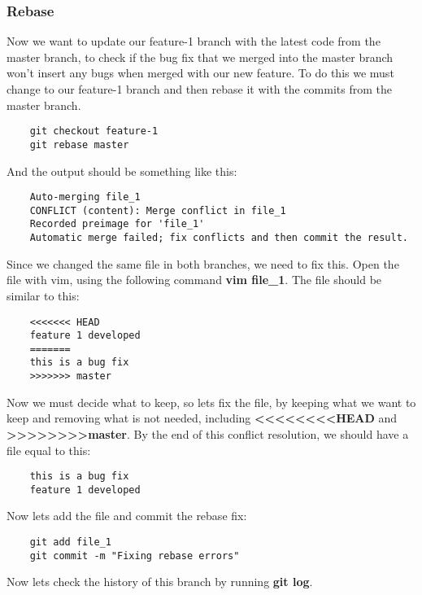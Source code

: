 \documentclass{article}
\begin{document}
\subsubsection{Rebase}

Now we want to update our feature-1 branch with the latest code from the master branch, to check if the bug fix that we merged into the master branch won't insert any bugs when merged with our new feature. To do this we must change to our feature-1 branch and then rebase it with the commits from the master branch.

\begin{lstlisting}
	git checkout feature-1
	git rebase master
\end{lstlisting}

And the output should be something like this:

\begin{lstlisting}
	Auto-merging file_1
	CONFLICT (content): Merge conflict in file_1
	Recorded preimage for 'file_1'
	Automatic merge failed; fix conflicts and then commit the result.
\end{lstlisting}

Since we changed the same file in both branches, we need to fix this. Open the file with vim, using the following command \textbf{vim file\_1}. The file should be similar to this:

\begin{lstlisting}
	<<<<<<< HEAD
	feature 1 developed
	=======
	this is a bug fix
	>>>>>>> master
\end{lstlisting}

Now we must decide what to keep, so lets fix the file, by keeping what we want to keep and removing what is not needed, including \textbf{\textless\textless\textless\textless\textless\textless\textless\textless HEAD} and \textbf{\textgreater\textgreater\textgreater\textgreater\textgreater\textgreater\textgreater\textgreater master}. By the end of this conflict resolution, we should have a file equal to this:

\begin{lstlisting}
	this is a bug fix
	feature 1 developed
\end{lstlisting}

Now lets add the file and commit the rebase fix:

\begin{lstlisting}
	git add file_1
	git commit -m "Fixing rebase errors"
\end{lstlisting}

Now lets check the history of this branch by running \textbf{git log}.
\end{document}
